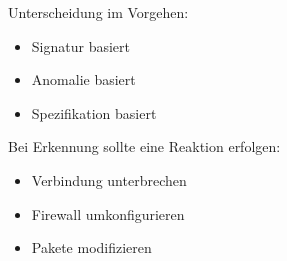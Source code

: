 \vspace{.3cm}

Unterscheidung im Vorgehen:
\begin{itemize}
    \item Signatur basiert
    \item Anomalie basiert
    \item Spezifikation basiert
\end{itemize}

\vspace{.3cm}

Bei Erkennung sollte eine Reaktion erfolgen:
\begin{itemize}
    \item Verbindung unterbrechen
    \item Firewall umkonfigurieren
    \item Pakete modifizieren
\end{itemize}
